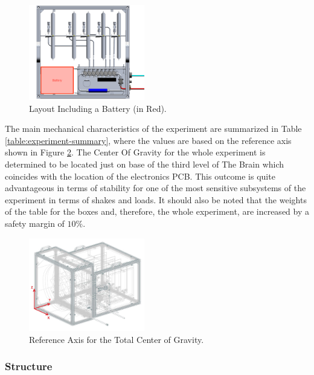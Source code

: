 \begin{figure}[H]
    \centering
    \includegraphics[width=0.45\textwidth]{4-experiment-design/img/Mechanical/Battery_Top_View.png}
    \caption{Layout Including a Battery (in Red).}
    \label{battery_distribution}
\end{figure}

The main mechanical characteristics of the experiment are summarized in Table \ref{table:experiment-summary}, where the values are based on the reference axis shown in Figure \ref{COG}. The Center Of Gravity for the whole experiment is determined to be located just on base of the third level of The Brain which coincides with the location of the electronics PCB. This outcome is quite advantageous in terms of stability for one of the most sensitive subsystems of the experiment in terms of shakes and loads. It should also be noted that the weights of the table for the boxes and, therefore, the whole experiment, are increased by a safety margin of $10\%$.



 \begin{figure}[H]
     \centering
     \includegraphics[width=0.45\textwidth]{4-experiment-design/img/Mechanical/COG.jpg}
     \caption{Reference Axis for the Total Center of Gravity.}
     \label{COG}
\end{figure}

\pagebreak
\subsubsection{Structure}
\label{sec:4.4.1}

